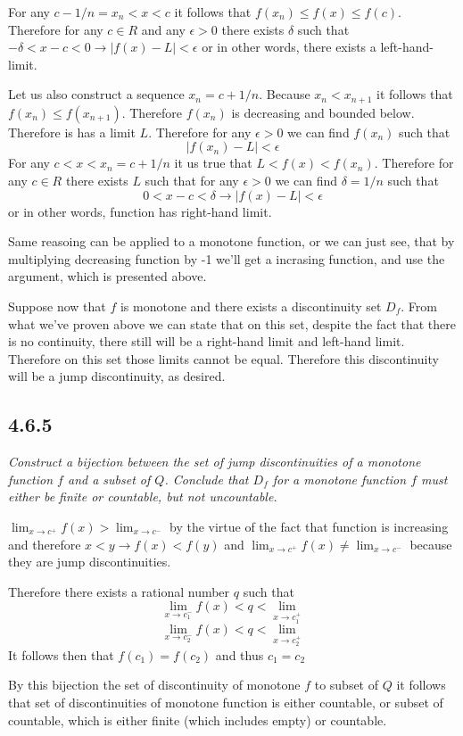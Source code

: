 \documentclass[11pt,oneside,titlepage]{book}
\begin{document}
For any $c - 1/n =  x_n < x < c$ it follows that $f(x_n) \leq f(x) \leq f(c)$. Therefore for any $c \in R$ and
any $\epsilon > 0$ there exists $\delta$ such that
$-\delta < x  - c< 0 \to |f(x) - L| < \epsilon$
or in other words, there exists a left-hand-limit.

Let us also construct a sequence $x_n = c + 1/n$. Because $x_n < x_{n + 1}$
it follows that $f(x_n) \leq f(x_{n + 1})$. Therefore $f(x_n)$ is decreasing
and bounded below. Therefore is has a limit $L$. Therefore for any
$\epsilon > 0$ we can find $f(x_n)$ such that
$$|f(x_n) - L| < \epsilon$$
For any  $c < x < x_n = c  + 1/n$ it us true that $L < f(x) < f(x_n)$.
Therefore for any $c \in R$ there exists $L$ such that
for any $\epsilon > 0$  we can find $\delta = 1/n$ such that
$$0 < x - c < \delta \to |f(x) - L| < \epsilon$$
or in other words, function has right-hand limit.

Same reasoing can be applied to a monotone function, or we can just see, that
by multiplying decreasing function by -1 we'll get a incrasing function, and
use the argument, which is presented above.

Suppose now that $f$ is monotone and there exists a discontinuity set $D_f$.
From what we've proven above we can state that on this set, despite the
fact that there is no continuity, there still will be a right-hand limit
and left-hand limit. Therefore on this set those limits cannot be equal.
Therefore this discontinuity will be a jump discontinuity, as desired.

\subsection*{4.6.5}
\textit{Construct a bijection between the set of jump discontinuities of a
  monotone function $f$ and a subset of $Q$. Conclude that $D_f$ for a monotone
  function $f$ must  either be finite or countable, but not uncountable.}

$\lim_{x \to c^+} f(x) > \lim_{x \to c^-}$ by the virtue
of the fact that function is increasing and therefore $x < y \to f(x) < f(y)$
and $\lim_{x \to c^+} f(x) \neq \lim_{x \to c^-}$  because they are jump
discontinuities.

Therefore there exists a rational number $q$ such that
$$\lim_{x \to c_1^-} f(x) < q < \lim_{x \to c_1^+}$$
$$\lim_{x \to c_2^-} f(x) < q < \lim_{x \to c_2^+}$$
It follows then that $f(c_1) = f(c_2)$ and thus $c_1 = c_2$

By this bijection the set of discontinuity of monotone $f$ to subset of  $Q$
it follows that set of discontinuities of monotone function is either
countable, or subset of countable, which is either
finite (which includes empty) or countable.
\end{document}

